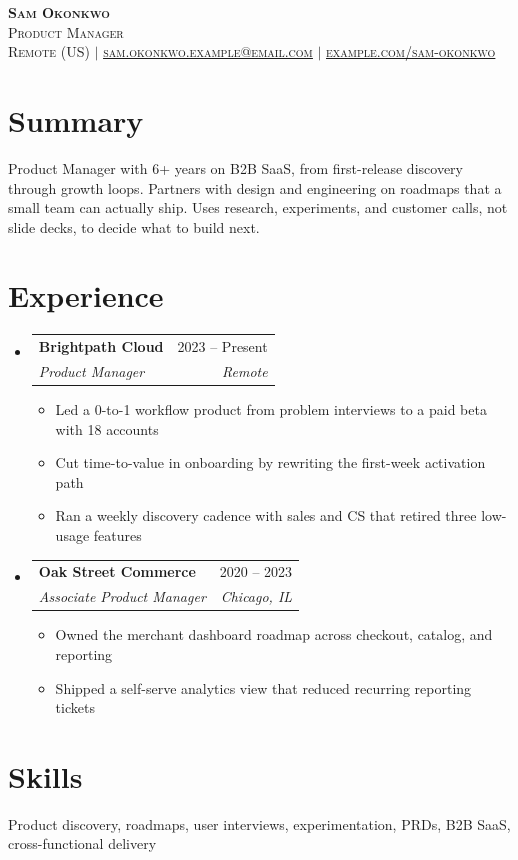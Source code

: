 \documentclass[letterpaper,11pt]{article}
\makeatletter
\newcommand{\resumeItem}[1]{\item\small{#1 \vspace{2pt}}}
\newcommand{\resumeSubheading}[4]{
  \vspace{-2pt}\item
  \begin{tabular*}{0.97\textwidth}[t]{l@{\extracolsep{\fill}}r}
    \textbf{#1} & #2 \\
    \textit{\small#3} & \textit{\small #4} \\
  \end{tabular*}\vspace{-7pt}
}
\newcommand{\resumeSubHeadingListStart}{\begin{itemize}[leftmargin=0.15in, label={}]}
\newcommand{\resumeSubHeadingListEnd}{\end{itemize}}
\newcommand{\resumeItemListStart}{\begin{itemize}}
\newcommand{\resumeItemListEnd}{\end{itemize}\vspace{-5pt}}
\makeatother
\begin{document}
\begin{center}
  \textbf{\Huge \scshape Sam Okonkwo} \\ \vspace{2pt}
  \small \scshape Product Manager \\ \vspace{8pt}
  \footnotesize Remote (US)
  \enspace$\vert$\enspace
  \href{mailto:sam.okonkwo.example@email.com}{\underline{sam.okonkwo.example@email.com}}
  \enspace$\vert$\enspace
  \href{https://example.com/sam-okonkwo}{\underline{example.com/sam-okonkwo}}
\end{center}

\section{Summary}
\small{
Product Manager with 6+ years on B2B SaaS, from first-release discovery through growth loops.
Partners with design and engineering on roadmaps that a small team can actually ship.
Uses research, experiments, and customer calls, not slide decks, to decide what to build next.
}

\section{Experience}
\resumeSubHeadingListStart
  \resumeSubheading
  {Brightpath Cloud}{2023 -- Present}
  {Product Manager}{Remote}
  \resumeItemListStart
    \resumeItem{Led a 0-to-1 workflow product from problem interviews to a paid beta with 18 accounts}
    \resumeItem{Cut time-to-value in onboarding by rewriting the first-week activation path}
    \resumeItem{Ran a weekly discovery cadence with sales and CS that retired three low-usage features}
  \resumeItemListEnd
  \resumeSubheading
  {Oak Street Commerce}{2020 -- 2023}
  {Associate Product Manager}{Chicago, IL}
  \resumeItemListStart
    \resumeItem{Owned the merchant dashboard roadmap across checkout, catalog, and reporting}
    \resumeItem{Shipped a self-serve analytics view that reduced recurring reporting tickets}
  \resumeItemListEnd
\resumeSubHeadingListEnd

\section{Skills}
\small{Product discovery, roadmaps, user interviews, experimentation, PRDs, B2B SaaS, cross-functional delivery}
\end{document}
